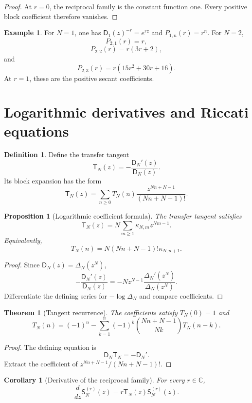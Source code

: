 \documentclass{aomart}
\newtheorem{theorem}{Theorem}[section]
\newtheorem{proposition}[proposition]{Proposition}
\newtheorem{corollary}[corollary]{Corollary}
\theoremstyle{definition}
\newtheorem{definition}[definition]{Definition}
\newtheorem{example}[example]{Example}
\theoremstyle{remark}
\newcommand{\CC}{\mathbb C}
\newcommand{\Dfun}{\mathsf D}
\newcommand{\Sfun}{\mathsf S}
\newcommand{\Tfun}{\mathsf T}
\begin{document}
\begin{proof}
At $r=0$, the reciprocal family is the constant function one.  Every positive block coefficient therefore vanishes.
\end{proof}

\begin{example}\label{ex:reciprocal_polynomials}
For $N=1$, one has $\Dfun_1(z)^{-r}=e^{rz}$ and $P_{1,n}(r)=r^n$.  For $N=2$,
\[
P_{2,1}(r)=r,
\]
\[
P_{2,2}(r)=r(3r+2),
\]
and
\[
P_{2,3}(r)=r(15r^2+30r+16).
\]
At $r=1$, these are the positive secant coefficients.
\end{example}

\section{Logarithmic derivatives and Riccati equations}\label{sec:tangent}

\begin{definition}\label{def:transfer_tangent}
Define the transfer tangent
\[
\Tfun_N(z)
=-\frac{\Dfun_N'(z)}{\Dfun_N(z)}.
\]
Its block expansion has the form
\[
\Tfun_N(z)
=
\sum_{n\geq0}T_N(n)
\frac{z^{Nn+N-1}}{(Nn+N-1)!}.
\]
\end{definition}

\begin{proposition}[Logarithmic coefficient formula]\label{prop:tangent_kappa}
The transfer tangent satisfies
\[
\Tfun_N(z)
=
N\sum_{m\geq1}\kappa_{N,m}z^{Nm-1}.
\]
Equivalently,
\[
T_N(n)
=
N(Nn+N-1)!\kappa_{N,n+1}.
\]
\end{proposition}

\begin{proof}
Since $\Dfun_N(z)=\Delta_N(z^N)$,
\[
-\frac{\Dfun_N'(z)}{\Dfun_N(z)}
=
-Nz^{N-1}\frac{\Delta_N'(z^N)}{\Delta_N(z^N)}.
\]
Differentiate the defining series for $-\log\Delta_N$ and compare coefficients.
\end{proof}

\begin{theorem}[Tangent recurrence]\label{thm:tangent_recurrence}
The coefficients satisfy $T_N(0)=1$ and
\[
T_N(n)
=
(-1)^n
-
\sum_{k=1}^{n}
(-1)^k
\binom{Nn+N-1}{Nk}
T_N(n-k).
\]
\end{theorem}

\begin{proof}
The defining equation is
\[
\Dfun_N\Tfun_N=-\Dfun_N'.
\]
Extract the coefficient of $z^{Nn+N-1}/(Nn+N-1)!$.
\end{proof}

\begin{corollary}[Derivative of the reciprocal family]\label{cor:reciprocal_derivative}
For every $r\in\CC$,
\[
\frac{d}{dz}\Sfun_N^{(r)}(z)
=
r\Tfun_N(z)\Sfun_N^{(r)}(z).
\]
\end{corollary}
\end{document}

